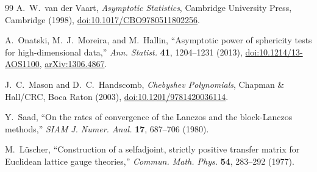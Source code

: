 \documentclass[11pt]{article}
\theoremstyle{definition}
\theoremstyle{remark}
\begin{document}
\begin{thebibliography}{99}
A.~W.~van der Vaart, \emph{Asymptotic Statistics}, Cambridge University
Press, Cambridge (1998),
\href{https://doi.org/10.1017/CBO9780511802256}{doi:10.1017/CBO9780511802256}.

A.~Onatski, M.~J.~Moreira, and M.~Hallin,
``Asymptotic power of sphericity tests for high-dimensional data,''
\emph{Ann. Statist.} \textbf{41}, 1204--1231 (2013),
\href{https://doi.org/10.1214/13-AOS1100}{doi:10.1214/13-AOS1100},
\href{https://arxiv.org/abs/1306.4867}{arXiv:1306.4867}.

J.~C.~Mason and D.~C.~Handscomb, \emph{Chebyshev Polynomials},
Chapman \& Hall/CRC, Boca Raton (2003),
\href{https://doi.org/10.1201/9781420036114}{doi:10.1201/9781420036114}.

Y.~Saad, ``On the rates of convergence of the Lanczos and the block-Lanczos
methods,'' \emph{SIAM J. Numer. Anal.} \textbf{17}, 687--706 (1980).

M.~L\"uscher, ``Construction of a selfadjoint, strictly positive transfer
matrix for Euclidean lattice gauge theories,'' \emph{Commun. Math. Phys.}
\textbf{54}, 283--292 (1977).

\end{thebibliography}
\end{document}
